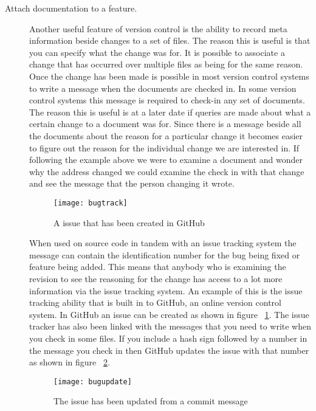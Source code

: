 \begin{description}
  \item [Attach documentation to a feature.]
  Another useful feature of version control is the ability to record meta information beside changes to a set of files.  The reason this is useful is that you can specify what the change was for.  It is possible to associate a change that has occurred over multiple files as being for the same reason.  Once the change has been made is possible in most version control systems to write a message when the documents are checked in.  In some version control systems this message is required to check-in any set of documents.  The reason this is useful is at a later date if queries are made about what a certain change to a document was for.  Since there is a message beside all the documents about the reason for a particular change it becomes easier to figure out the reason for the individual change we are interested in. If following the example above we were to examine a document and wonder why the address changed we could examine the check in with that change and see the message that the person changing it wrote.

  \begin{figure}[h]
   \begin{center}
    \texttt{[image: bugtrack]}
   \end{center}
   \caption{A issue that has been created in GitHub}
   \label{fig:bgBugTrack}
  \end{figure}

  When used on source code in tandem with an issue tracking system the message can contain the identification number for the bug being fixed or feature being added.  This means that anybody who is examining the revision to see the reasoning for the change has access to a lot more information via the issue tracking system. An example of this is the issue tracking ability that is built in to GitHub, an online version control system. In GitHub an issue can be created as shown in figure ~\ref{fig:bgBugTrack}. The issue tracker has also been linked with the messages that you need to write when you check in some files. If you include a hash sign followed by a number in the message you check in then GitHub updates the issue with that number as shown in figure ~\ref{fig:bgBugUpdate}.

  \begin{figure}[h]
   \begin{center}
    \texttt{[image: bugupdate]}
   \end{center}
   \caption{The issue has been updated from a commit message}
   \label{fig:bgBugUpdate}
  \end{figure}


\end{description}
